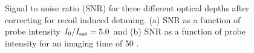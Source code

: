 \documentclass[12pt]{iopart}
\begin{document}
\begin{figure}
\caption{Signal to noise ratio (SNR) for three different optical depths after correcting for recoil induced detuning. (a) SNR as a function of probe intensity $I_0/I_{\rm{sat}}=5.0$ and (b) SNR as a function of probe intensity for an imaging time of 50 \us{}.}  
\label{fig:SNR}
\end{figure}
\end{document}

